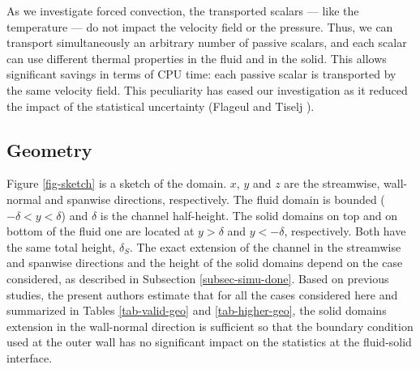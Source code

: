 \documentclass{svjour3}                     %
\begin{document}
As we investigate forced convection, the transported scalars --- like the temperature --- do not impact the velocity field or the pressure.
Thus, we can transport simultaneously an arbitrary number of passive scalars, and each scalar can use different thermal properties in the fluid and in the solid.
This allows significant savings in terms of CPU time: each passive scalar is transported by the same velocity field.
This peculiarity has eased our investigation as it reduced the impact of the statistical uncertainty (Flageul and Tiselj \cite{flageul2017impact}).

\subsection{Geometry}
\label{subsec-geom}

Figure \ref{fig-sketch} is a sketch of the domain. $x$, $y$ and $z$ are the streamwise, wall-normal and spanwise directions, respectively.
The fluid domain is bounded (${-\delta < y < \delta}$) and $\delta$ is the channel half-height.
The solid domains on top and on bottom of the fluid one are located at ${y > \delta}$ and ${y < -\delta}$, respectively.
Both have the same total height, $\delta_S$.
The exact extension of the channel in the streamwise and spanwise directions and the height of the solid domains depend on the case considered, as described in Subsection \ref{subsec-simu-done}.
Based on previous studies, the present authors estimate that for all the cases considered here and summarized in Tables \ref{tab-valid-geo} and \ref{tab-higher-geo}, the solid domains extension in the wall-normal direction is sufficient so that the boundary condition used at the outer wall has no significant impact on the statistics at the fluid-solid interface.
\end{document}
